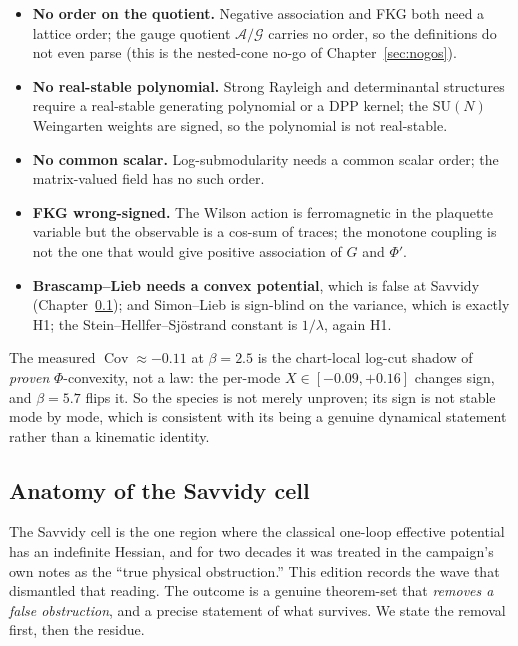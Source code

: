 \begin{itemize}
\item \textbf{No order on the quotient.} Negative association and FKG both need a lattice order;
  the gauge quotient $\mathcal{A}/\mathcal{G}$ carries no order, so the definitions do not even
  parse (this is the nested-cone no-go of Chapter~\ref{sec:nogos}).
\item \textbf{No real-stable polynomial.} Strong Rayleigh and determinantal structures require a
  real-stable generating polynomial or a DPP kernel; the $\mathrm{SU}(N)$ Weingarten weights are
  signed, so the polynomial is not real-stable.
\item \textbf{No common scalar.} Log-submodularity needs a common scalar order; the matrix-valued
  field has no such order.
\item \textbf{FKG wrong-signed.} The Wilson action is ferromagnetic in the plaquette variable but
  the observable is a cos-sum of traces; the monotone coupling is not the one that would give
  positive association of $G$ and $\Phi'$.
\item \textbf{Brascamp--Lieb needs a convex potential}, which is false at Savvidy
  (Chapter~\ref{sec:savvidy}); and Simon--Lieb is sign-blind on the variance, which is exactly
  H1; the Stein--Hellfer--Sj\"ostrand constant is $1/\lambda$, again H1.
\end{itemize}

The measured $\operatorname{Cov}\approx-0.11$ at $\beta=2.5$ is the chart-local log-cut shadow of
\emph{proven} $\Phi$-convexity, not a law: the per-mode $X\in[-0.09,+0.16]$ changes sign, and
$\beta=5.7$ flips it. So the species is not merely unproven; its sign is not stable mode by mode,
which is consistent with its being a genuine dynamical statement rather than a kinematic
identity.

\subsection{Anatomy of the Savvidy cell}
\label{sec:savvidy}

The Savvidy cell is the one region where the classical one-loop effective potential has an
indefinite Hessian, and for two decades it was treated in the campaign's own notes as the
``true physical obstruction.'' This edition records the wave that dismantled that reading. The
outcome is a genuine theorem-set that \emph{removes a false obstruction}, and a precise
statement of what survives. We state the removal first, then the residue.

